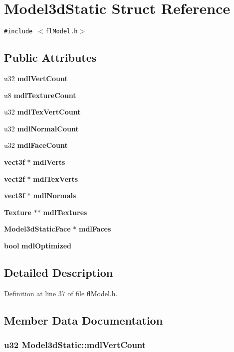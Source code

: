 \section{Model3d\-Static Struct Reference}
\label{structModel3dStatic}
{\tt \#include $<$fl\-Model.h$>$}

\subsection*{Public Attributes}
\begin{CompactItemize}
\item 
u32 {\bf mdl\-Vert\-Count}
\item 
u8 {\bf mdl\-Texture\-Count}
\item 
u32 {\bf mdl\-Tex\-Vert\-Count}
\item 
u32 {\bf mdl\-Normal\-Count}
\item 
u32 {\bf mdl\-Face\-Count}
\item 
{\bf vect3f} $\ast$ {\bf mdl\-Verts}
\item 
{\bf vect2f} $\ast$ {\bf mdl\-Tex\-Verts}
\item 
{\bf vect3f} $\ast$ {\bf mdl\-Normals}
\item 
{\bf Texture} $\ast$$\ast$ {\bf mdl\-Textures}
\item 
{\bf Model3d\-Static\-Face} $\ast$ {\bf mdl\-Faces}
\item 
{\bf bool} {\bf mdl\-Optimized}
\end{CompactItemize}


\subsection{Detailed Description}




Definition at line 37 of file fl\-Model.h.

\subsection{Member Data Documentation}
\subsubsection{\setlength{\rightskip}{0pt plus 5cm}u32 {\bf Model3d\-Static::mdl\-Vert\-Count}}\label{structModel3dStatic_f478acfae1a2e3154e37f71fedbbef3e}




